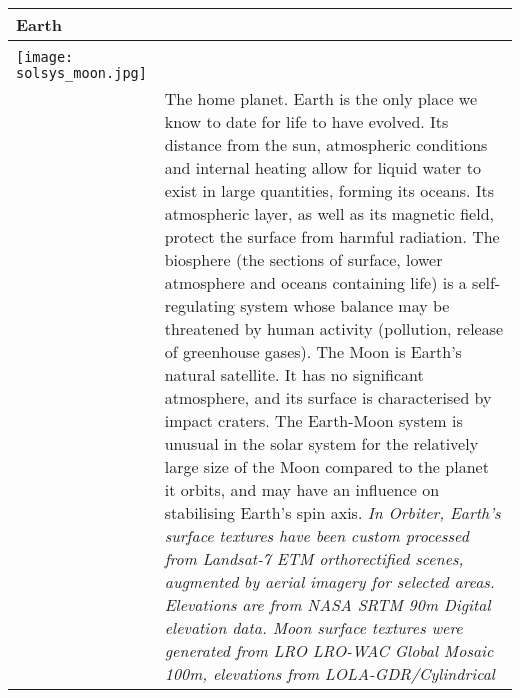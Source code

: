 \documentclass[Orbiter User Manual.tex]{subfiles}
\begin{document}
\begin{table}[H]
	\begin{tabularx}{\textwidth}{ |lX| }
	\hline\rule{0pt}{2ex}
	\textbf{Earth} &\\
	\hline\rule{0pt}{2ex}
	\adjustbox{valign=t}{
		\begin{tabular}{ c }
		\texttt{[image: solsys\_earth.jpg]}\\
		\texttt{[image: solsys\_moon.jpg]}\\
		\end{tabular}
		}
	& \vfill
	The home planet. Earth is the only place we know to date for life to have evolved. Its distance from the sun, atmospheric conditions and internal heating allow for liquid water to exist in large quantities, forming its oceans. Its atmospheric layer, as well as its magnetic field, protect the surface from harmful radiation. The bio­sphere (the sections of surface, lower atmosphere and oceans containing life) is a self-regulating system whose balance may be threatened by human activity (pollution, release of greenhouse gases).\newline
	The Moon is Earth’s natural satellite. It has no significant atmosphere, and its surface is characterised by impact craters. The Earth-Moon system is unusual in the solar system for the relatively large size of the Moon compared to the planet it orbits, and may have an influence on stabilising Earth’s spin axis.\newline
	\newline
	\textit{In Orbiter, Earth’s surface textures have been custom processed from Landsat-7 ETM orthorectified scenes, augmented by aerial imagery for selected areas. Elevations are from NASA SRTM 90m Digital elevation data. Moon surface textures were generated from LRO LRO-WAC Global Mosaic 100m, elevations from LOLA-GDR/Cylindrical}\\
	\hline
	\end{tabularx}
\end{table}
\end{document}
